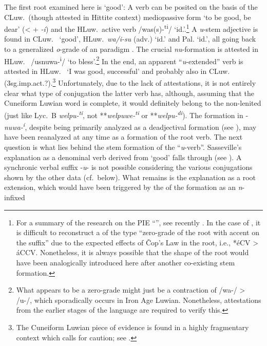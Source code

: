 \documentclass[output=paper,colorlinks,citecolor=brown]{langscibook}
\begin{document}
The first root examined here is  ‘good’: A  verb can be posited on the basis of the CLuw.\ (though attested in Hittite context) mediopassive form  ‘to be good, be dear’ (<  + \textit{-i}) and the HLuw.\ active verb  /was(s)-\textsuperscript{ti}/ ‘id.’.\footnote{For a summary of the research on the PIE “”, see recently \citealt{Grestenberger2019}. In the case of , it is difficult to reconstruct a  of the type “zero-grade of the root with accent on the suffix” due to the expected effects of Čop’s Law in the root, i.e., *éCV > áCCV. Nonetheless, it is always possible that the shape of the root would have been analogically introduced here after another co-existing stem formation.} A \textit{u}-stem adjective is found in CLuw.\  ‘good’, HLuw.\ \textit{wa/i-su} (adv.) ‘id.’ and Pal.  ‘id.’, all going back to a generalized \textit{o}-grade of an  paradigm . The crucial \textit{nu}-formation is attested in HLuw.\  /usnuwa-\textsuperscript{i}/ ‘to bless’.\footnote{What appears to be a zero-grade might just be a contraction of /wa-/ > /u-/, which sporadically occurs in Iron Age Luwian. Nonetheless, attestations from the earlier stages of the language are required to verify this.} In the end, an apparent “\textit{u}-extended” verb is attested in HLuw.\  ‘I was good, successful’ and probably also in CLuw.\ \iwi{CLuw}{\textit{wašuddu}[} (3sg.imp.act.?).\footnote{The Cuneiform Luwian piece of evidence is found in a highly fragmentary context which calls for caution; see \citealt[179]{Sasseville2021b}.} Unfortunately, due to the lack of attestations, it is not entirely clear what type of conjugation the latter verb has, although, assuming that the Cuneiform Luwian word is complete, it would definitely belong to the non-lenited  (just like Lyc.\ B \textit{welpu-\textsuperscript{ti}}, not **\textit{welpuwe-\textsuperscript{ti}} or **\textit{welpu-\textsuperscript{di}}). The formation in -\textit{nuwa-\textsuperscript{i}}, despite being primarily analyzed as a deadjectival  formation (see ), may have been reanalyzed at any time as a  formation of the root verb. The next question is what lies behind the stem formation of the “\textit{u}-verb”. Sasseville’s explanation as a denominal verb  derived from  ‘good’ falls through (see ). A synchronic verbal suffix -\textit{u}- is not possible considering the various conjugations shown by the other data (cf.\ below). What remains is the explanation as a root extension, which would have been triggered by the  of the  formation as an \textit{n}-infixed 
\end{document}
